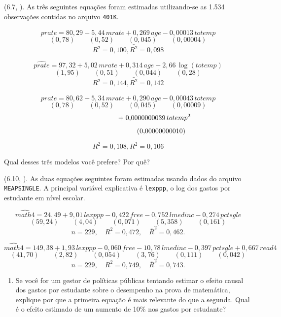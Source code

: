 \documentclass[12pt,letterpaper, onecolumn]{exam}
\begin{document}
	\begin{questions}
		
		\question (6.7, \citep{wooldridge2016}). As três seguintes equações foram estimadas utilizando-se as 1.534 observações contidas no arquivo \texttt{401K}.
		
		\[
		\widehat{prate} = 80{,}29 + 5{,}44\,mrate + 0{,}269\,age - 0{,}00013\,totemp
		\]
		\[
		(0{,}78)\qquad (0{,}52)\qquad (0{,}045)\qquad (0{,}00004)
		\]
		\[
		R^2 = 0{,}100, \bar{R^2} = 0,098
		\]
		
		\[
		\widehat{prate} = 97{,}32 + 5{,}02\,mrate + 0{,}314\,age - 2{,}66\,\log(totemp)
		\]
		\[
		(1{,}95)\qquad (0{,}51)\qquad (0{,}044)\qquad (0{,}28)
		\]
		\[
		R^2 = 0{,}144, \bar{R^2} = 0,142
		\]
		
		\[
		\widehat{prate} = 80{,}62 + 5{,}34\,mrate + 0{,}290\,age - 0{,}00043\,totemp
		\]
		\[
		(0{,}78)\qquad (0{,}52)\qquad (0{,}045)\qquad (0{,}00009)
		\]
		\[
		\hspace{2.7cm} +\; 0{,}0000000039\,totemp^2
		\]
		\[
		\hspace{2.7cm} \qquad (0{,}00000000010)
		\]
		\[
		R^2 = 0{,}108, \bar{R^2} = 0,106
		\]
		
		Qual desses três modelos você prefere? Por quê?
		
		\vspace{0.7cm}
		
		\question\qstar (6.10, \citep{wooldridge2016}). As duas equações seguintes foram estimadas usando dados do arquivo \texttt{MEAPSINGLE}. A principal variável explicativa é \texttt{lexppp}, o log dos gastos por estudante em nível escolar.
		
		\[
		\widehat{math4} = 24{,}49 + 9{,}01\,lexppp - 0{,}422\,free - 0{,}752\,lmedinc - 0{,}274\,pctsgle
		\]
		\[
		(59{,}24)\qquad (4{,}04)\qquad (0{,}071)\qquad (5{,}358)\qquad (0{,}161)
		\]
		\[
		n = 229,\quad R^2 = 0{,}472,\quad \bar{R}^2 = 0{,}462.
		\]
		
		\[
		\widehat{math4} = 149{,}38 + 1{,}93\,lexppp - 0{,}060\,free - 10{,}78\,lmedinc - 0{,}397\,pctsgle + 0{,}667\,read4
		\]
		\[
		(41{,}70)\qquad (2{,}82)\qquad (0{,}054)\qquad (3{,}76)\qquad (0{,}111)\qquad (0{,}042)
		\]
		\[
		n = 229,\quad R^2 = 0{,}749,\quad \bar{R}^2 = 0{,}743.
		\]
		
		\begin{enumerate}[label=(\roman*)]
			\item Se você for um gestor de políticas públicas tentando estimar o efeito causal dos gastos por estudante sobre o desempenho na prova de matemática, explique por que a primeira equação é mais relevante do que a segunda. Qual é o efeito estimado de um aumento de 10\% nos gastos por estudante?
			

\end{enumerate}
\end{questions}
\end{document}
